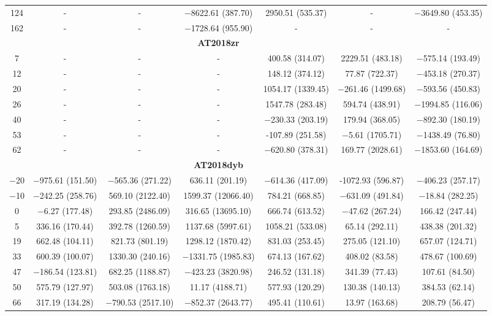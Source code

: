 \documentclass[structabstract]{aa}
\begin{document}
\begin{small}
\begin{longtable}{c c c c c c c}
124	&	-	&	-	&	$-$8622.61 (387.70)	&	2950.51 (535.37)	&	-	&	$-$3649.80 (453.35)  \\
162	&	-	&	-	&	$-$1728.64 (955.90)	&	-	&	-	&	- \\ \hline
	&		&		&	\textbf{AT2018zr}			&		&	\\ \hline
7	&	-	&	-	&	-	&	400.58 (314.07)	&	2229.51 (483.18)	&	$-$575.14 (193.49)  \\
12	&	-	&	-	&	-	&	148.12 (374.12)	&	77.87 (722.37)	&	$-$453.18 (270.37)  \\
20	&	-	&	-	&	-	&	1054.17 (1339.45)	&	$-$261.46 (1499.68)	&	$-$593.56 (450.83)  \\
26	&	-	&	-	&	-	&	1547.78 (283.48)	&	594.74 (438.91)	&	$-$1994.85 (116.06)  \\
40	&	-	&	-	&	-	&	$-$230.33 (203.19)	&	179.94 (368.05)	&	$-$892.30 (180.19)  \\
53	&	-	&	-	&	-	&	-107.89 (251.58)	&	$-$5.61 (1705.71)	&	$-$1438.49 (76.80)  \\
62	&	-	&	-	&	-	&	$-$620.80 (378.31)	&	169.77 (2028.61)	&	$-$1853.60 (164.69)  \\ \hline
	&		&		&	\textbf{AT2018dyb}	&		&		&	\\ \hline
$-$20	&	$-$975.61 (151.50)	&	$-$565.36 (271.22)	&	636.11 (201.19)	&	$-$614.36 (417.09)	&	-1072.93 (596.87)	&	$-$406.23 (257.17)  \\
$-$10	&	$-$242.25 (258.76)	&	569.10 (2122.40)	&	1599.37 (12066.40)	&	784.21 (668.85)	&	$-$631.09 (491.84)	&	$-$18.84 (282.25)  \\
0	&	$-$6.27 (177.48)	&	293.85 (2486.09)	&	316.65 (13695.10)	&	666.74 (613.52)	&	$-$47.62 (267.24)	&	166.42 (247.44)  \\
5	&	336.16 (170.44)	&	392.78 (1260.59)	&	1137.68 (5997.61)	&	1058.21 (533.08)	&	65.14 (292.11)	&	438.38 (201.32)  \\
19	&	662.48 (104.11)	&	821.73 (801.19)	&	1298.12 (1870.42)	&	831.03 (253.45)	&	275.05 (121.10)	&	657.07 (124.71)  \\
33	&	600.39 (100.07)	&	1330.30 (240.16)	&	$-$1331.75 (1985.83)	&	674.13 (167.62)	&	408.02 (83.58)	&	478.67 (100.69)  \\
47	&	$-$186.54 (123.81)	&	682.25 (1188.87)	&	$-$423.23 (3820.98)	&	246.52 (131.18)	&	341.39 (77.43)	&	107.61 (84.50)  \\
50	&	575.79 (127.97)	&	503.08 (1763.18)	&	11.17 (4188.71)	&	577.93 (120.29)	&	130.38 (140.13)	&	384.53 (62.14)  \\
66	&	317.19 (134.28)	&	$-$790.53 (2517.10)	&	$-$852.37 (2643.77)	&	495.41 (110.61)	&	13.97 (163.68)	&	208.79 (56.47)  \\

\end{longtable}
\end{small}
\end{document}

